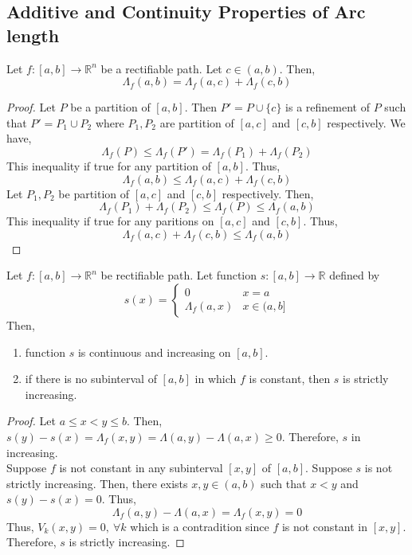 \subsection{Additive and Continuity Properties of Arc length}
\begin{theorem}[additive]
	Let $f : [a,b] \to \mathbb{R}^n$ be a rectifiable path.	
	Let $c \in (a,b)$.
	Then,
	\[ \Lambda_f(a,b) = \Lambda_f(a,c) + \Lambda_f(c,b) \]
\end{theorem}
\begin{proof}
	Let $P$ be a partition of $[a,b]$.
	Then $P' = P \cup \{c\}$ is a refinement of $P$ such that $P' = P_1 \cup P_2$ where $P_1,P_2$ are partition of $[a,c]$ and $[c,b]$ respectively.
	We have,
	\[ \Lambda_f(P) \le \Lambda_f(P') = \Lambda_f(P_1) + \Lambda_f(P_2) \]
	This inequality if true for any partition of $[a,b]$.
	Thus,
	\[ \Lambda_f(a,b) \le \Lambda_f(a,c) + \Lambda_f(c,b) \]
	Let $P_1,P_2$ be partition of $[a,c]$ and $[c,b]$ respectively.
	Then,
	\[ \Lambda_f(P_1) + \Lambda_f(P_2) \le \Lambda_f(P) \le \Lambda_f(a,b) \]
	This inequality if true for any paritions on $[a,c]$ and $[c,b]$.
	Thus,
	\[ \Lambda_f(a,c) + \Lambda_f(c,b) \le \Lambda_f(a,b) \]
\end{proof}
\begin{theorem}[continuity]
	Let $f : [a,b] \to \mathbb{R}^n$ be  rectifiable path.
	Let function $s : [a,b] \to \mathbb{R}$ defined by
	\[ s(x) = \begin{cases} 0 & x = a \\ \Lambda_f(a,x) & x \in (a,b] \end{cases} \]
	Then,
	\begin{enumerate}
		\item function $s$ is continuous and increasing on $[a,b]$.
		\item if there is no subinterval of $[a,b]$ in which $f$ is constant, then $s$ is strictly increasing.
	\end{enumerate}
\end{theorem}
\begin{proof}
	Let $a \le x < y \le b$.
	Then, $s(y)-s(x) = \Lambda_f(x,y) = \Lambda(a,y) - \Lambda(a,x) \ge 0$.
	Therefore, $s$ in increasing.\\
	
	Suppose $f$ is not constant in any subinterval $[x,y]$ of $[a,b]$.
	Suppose $s$ is not strictly increasing.
	Then, there exists $x,y \in (a,b)$ such that $x < y$ and $s(y)-s(x) = 0$.
	Thus,
	\[ \Lambda_f(a,y) - \Lambda(a,x) = \Lambda_f(x,y) = 0 \]
	Thus, $V_k(x,y) = 0,\ \forall k$ which is a contradition since $f$ is not constant in $[x,y]$.
	Therefore, $s$ is strictly increasing.
\end{proof}
